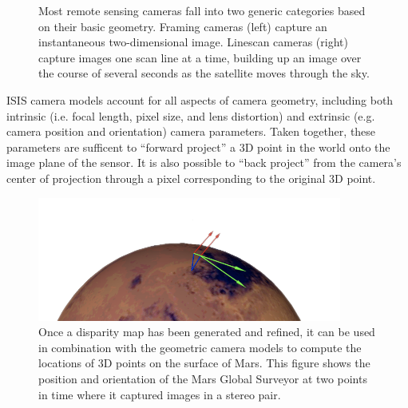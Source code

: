 \begin{figure}[h]
\centering
\caption{Most remote sensing cameras fall into two generic categories
  based on their basic geometry.  Framing cameras (left) capture an
  instantaneous two-dimensional image.  Linescan cameras (right)
  capture images one scan line at a time, building up an image over
  the course of several seconds as the satellite moves through the
  sky.}
\label{fig:camera_models}
\end{figure}

ISIS camera models account for all aspects of camera geometry,
including both intrinsic (i.e. focal length, pixel size, and lens
distortion) and extrinsic (e.g. camera position and orientation)
camera parameters.  Taken together, these parameters are sufficent to
``forward project'' a 3D point in the world onto the image plane of
the sensor.  It is also possible to ``back project'' from the camera's
center of projection through a pixel corresponding to the original 3D
point.

\begin{figure}[b!]
  \centering
  \includegraphics[width=10cm]{images/correlation/triangulation}
  \caption{Once a disparity map has been generated and refined, it can
    be used in combination with the geometric camera models to compute
    the locations of 3D points on the surface of Mars.  This figure
    shows the position and orientation of the Mars Global Surveyor at
    two points in time where it captured images in a stereo pair.}
  \label{fig:triangulation}
\end{figure}

